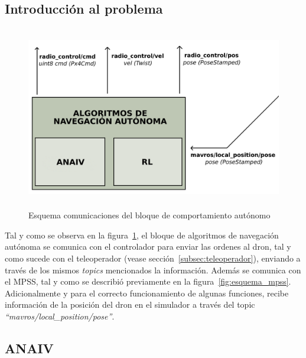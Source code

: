 \subsection{Introducción al problema}
\label{subsec:intro_sf}

\begin{figure} [t]
    \begin{center}
    \includegraphics[height=8cm]{imagenes/cap4/5_esquema_comp_auto.png}
    \end{center}
	\caption[Esquema comunicaciones del bloque de comportamiento autónomo]{Esquema comunicaciones del bloque de comportamiento autónomo}
	\label{fig:esquema_auto}
\end{figure}

Tal y como se observa en la figura~\ref{fig:esquema_auto}, el bloque de algoritmos de navegación autónoma se comunica con el controlador para enviar las ordenes al dron, tal y como sucede con el teleoperador (vease sección~\ref{subsec:teleoperador}), enviando a través de los mismos \emph{topics} mencionados la información. Además se comunica con el \ac{MPSS}, tal y como se describió previamente en la figura~\ref{fig:esquema_mpss}. Adicionalmente y para el correcto funcionamiento de algunas funciones, recibe información de la posición del dron en el simulador a través del topic \emph{``mavros/local\_position/pose''}.

\subsection{\ac{ANAIV}}
\label{subsec:algoritmo_sf}

